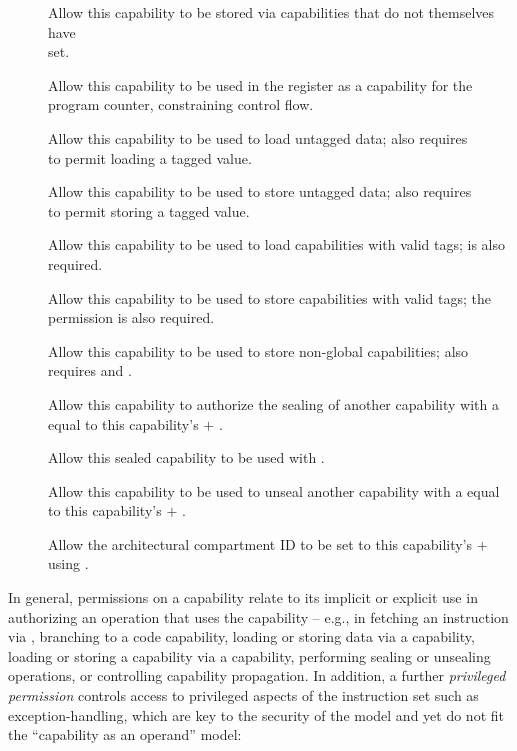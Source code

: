\begin{description}
\item[\cappermG] Allow this capability to be stored via capabilities that do not themselves have \\ \cappermSLC set.

\item[\cappermX] Allow this capability to be used in the \PCC{} register as a capability for the program counter, constraining control flow.

\item[\cappermL] Allow this capability to be used to load untagged data; also requires \\ \cappermLC to permit loading a tagged value.

\item[\cappermS] Allow this capability to be used to store untagged data; also requires \\ \cappermSC to permit storing a tagged value.

\item[\cappermLC] Allow this capability to be used to load capabilities with valid tags; \cappermL is also required.

\item[\cappermSC] Allow this capability to be used to store capabilities with valid tags; the permission \cappermS is also required.

\item[\cappermSLC] Allow this capability to be used to store non-global capabilities; also requires \cappermS and \cappermSC.

\item[\cappermSeal] Allow this capability to authorize the sealing of another capability with a \cotype{} equal to this capability's \cbase{} $+$ \coffset{}.

\item[\cappermInvoke] Allow this sealed capability to be used with .

\item[\cappermUnseal] Allow this capability to be used to unseal another capability with a \cotype{} equal to this capability's \cbase{} $+$ \coffset{}.

\item[\cappermCid] Allow the architectural compartment ID to be set to this capability's \cbase{} $+$ \coffset{} using .
\end{description}

In general, permissions on a capability relate to its implicit or explicit
use in authorizing an operation that uses the capability -- e.g., in fetching
an instruction via \PCC{}, branching to a code capability, loading or storing
data via a capability, loading or storing a capability via a capability,
performing sealing or unsealing operations, or controlling capability
propagation.
In addition, a further \textit{privileged permission} controls access to
privileged aspects of the instruction set such as exception-handling, which
are key to the security of the model and yet do not fit the ``capability as an
operand'' model:

